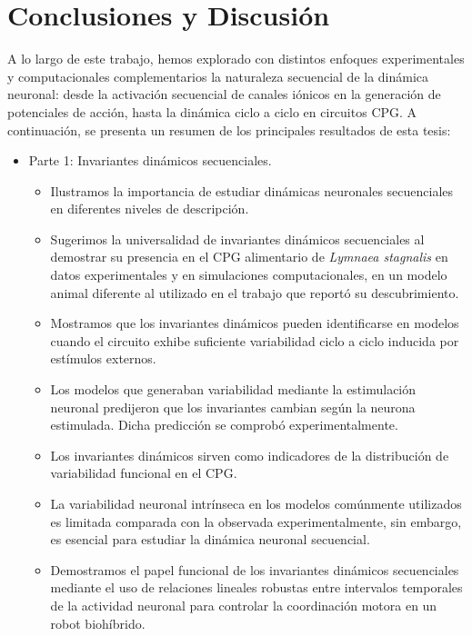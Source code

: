 \chapter{Conclusiones y Discusión} %

A lo largo de este trabajo, hemos explorado con distintos enfoques experimentales y computacionales complementarios la naturaleza secuencial de la dinámica neuronal: desde la activación secuencial de canales iónicos en la generación de potenciales de acción, hasta la dinámica ciclo a ciclo en circuitos CPG. A continuación, se presenta un resumen de los principales resultados de esta tesis:

\begin{itemize}
	\item Parte 1: Invariantes dinámicos secuenciales.
	\begin{itemize}
		\item Ilustramos la importancia de estudiar dinámicas neuronales secuenciales en diferentes niveles de descripción.
		\item Sugerimos la universalidad de invariantes dinámicos secuenciales al demostrar su presencia en el CPG alimentario de \textit{Lymnaea stagnalis} en datos experimentales y en simulaciones computacionales, en un modelo animal diferente al utilizado en el trabajo que reportó su descubrimiento.
		\item Mostramos que los invariantes dinámicos pueden identificarse en modelos cuando el circuito exhibe suficiente variabilidad ciclo a ciclo inducida por estímulos externos.
		\item Los modelos que generaban variabilidad mediante la estimulación neuronal predijeron que los invariantes cambian según la neurona estimulada. Dicha predicción se comprobó experimentalmente.
		\item Los invariantes dinámicos sirven como indicadores de la distribución de variabilidad funcional en el CPG.
		\item La variabilidad neuronal intrínseca en los modelos comúnmente utilizados es limitada comparada con la observada experimentalmente, sin embargo, es esencial para estudiar la dinámica neuronal secuencial.
		\item Demostramos el papel funcional de los invariantes dinámicos secuenciales mediante el uso de relaciones lineales robustas entre  intervalos temporales de la actividad neuronal para controlar la coordinación motora en un robot biohíbrido.
	\end{itemize}
	

\end{itemize}

